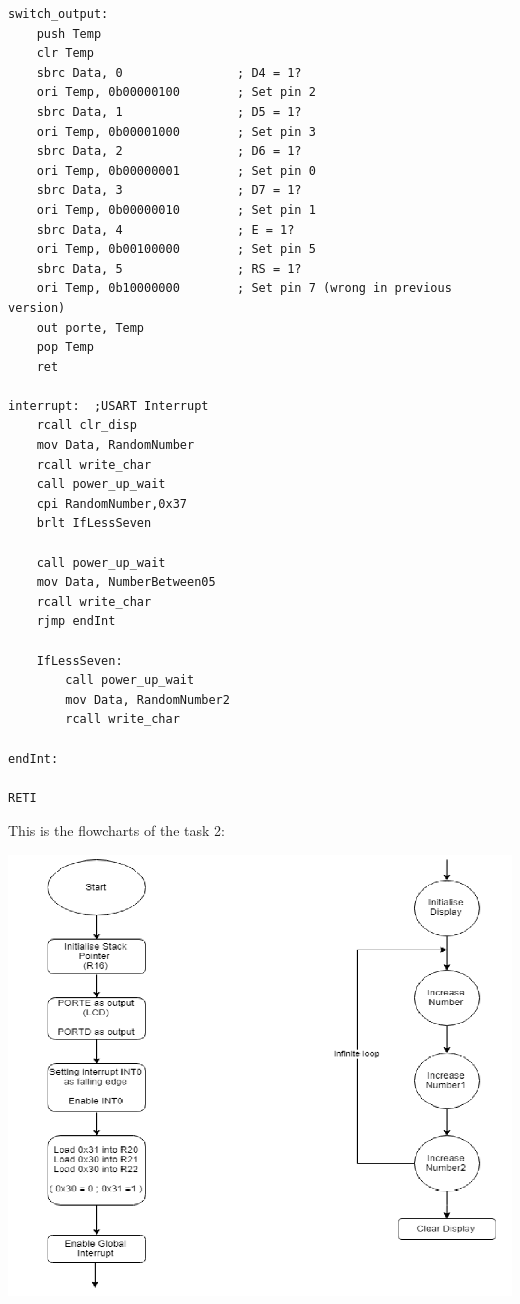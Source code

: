 \documentclass[a4paper,12pt]{article}
\begin{document}
\begin{lstlisting}
switch_output:
	push Temp
	clr Temp
	sbrc Data, 0				; D4 = 1?
	ori Temp, 0b00000100		; Set pin 2 
	sbrc Data, 1				; D5 = 1?
	ori Temp, 0b00001000		; Set pin 3 
	sbrc Data, 2				; D6 = 1?
	ori Temp, 0b00000001		; Set pin 0 
	sbrc Data, 3				; D7 = 1?
	ori Temp, 0b00000010		; Set pin 1 
	sbrc Data, 4				; E = 1?
	ori Temp, 0b00100000		; Set pin 5 
	sbrc Data, 5				; RS = 1?
	ori Temp, 0b10000000		; Set pin 7 (wrong in previous version)
	out porte, Temp
	pop Temp
	ret

interrupt: 	;USART Interrupt
	rcall clr_disp
	mov Data, RandomNumber
	rcall write_char
	call power_up_wait
	cpi RandomNumber,0x37
	brlt IfLessSeven

	call power_up_wait
	mov Data, NumberBetween05
	rcall write_char
	rjmp endInt

	IfLessSeven:
		call power_up_wait
		mov Data, RandomNumber2
		rcall write_char

endInt:

RETI 
\end{lstlisting}
\newpage
This is the flowcharts of the task 2:
\begin{center}
\includegraphics[scale=0.9]{img/Task2.png}
\end{center}
\end{document}
